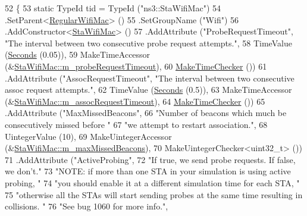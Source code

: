 \begin{DoxyCode}
52 \{
53   \textcolor{keyword}{static} TypeId tid = TypeId (\textcolor{stringliteral}{"ns3::StaWifiMac"})
54     .SetParent<\hyperlink{classns3_1_1RegularWifiMac_a56bc0e2b8ecde6fc50e6f8921ce64957}{RegularWifiMac}> ()
55     .SetGroupName (\textcolor{stringliteral}{"Wifi"})
56     .AddConstructor<\hyperlink{classns3_1_1StaWifiMac_afdd976cc1453f809bb1cad9924e9ff04}{StaWifiMac}> ()
57     .AddAttribute (\textcolor{stringliteral}{"ProbeRequestTimeout"}, \textcolor{stringliteral}{"The interval between two consecutive probe request attempts."},
58                    TimeValue (\hyperlink{group__timecivil_ga33c34b816f8ff6628e33d5c8e9713b9e}{Seconds} (0.05)),
59                    MakeTimeAccessor (&\hyperlink{classns3_1_1StaWifiMac_acd3c1903e18cd6b544fa4d373f970613}{StaWifiMac::m\_probeRequestTimeout}),
60                    \hyperlink{group__time_ga7032965bd4afa578691d88c09e4481c1}{MakeTimeChecker} ())
61     .AddAttribute (\textcolor{stringliteral}{"AssocRequestTimeout"}, \textcolor{stringliteral}{"The interval between two consecutive assoc request attempts."},
62                    TimeValue (\hyperlink{group__timecivil_ga33c34b816f8ff6628e33d5c8e9713b9e}{Seconds} (0.5)),
63                    MakeTimeAccessor (&\hyperlink{classns3_1_1StaWifiMac_acac4078bfd17c0ecc1991b88fd97a242}{StaWifiMac::m\_assocRequestTimeout}),
64                    \hyperlink{group__time_ga7032965bd4afa578691d88c09e4481c1}{MakeTimeChecker} ())
65     .AddAttribute (\textcolor{stringliteral}{"MaxMissedBeacons"},
66                    \textcolor{stringliteral}{"Number of beacons which much be consecutively missed before "}
67                    \textcolor{stringliteral}{"we attempt to restart association."},
68                    UintegerValue (10),
69                    MakeUintegerAccessor (&\hyperlink{classns3_1_1StaWifiMac_a725655d9a8bb335d6156a0c0a5b0753f}{StaWifiMac::m\_maxMissedBeacons}),
70                    MakeUintegerChecker<uint32\_t> ())
71     .AddAttribute (\textcolor{stringliteral}{"ActiveProbing"},
72                    \textcolor{stringliteral}{"If true, we send probe requests. If false, we don't."}
73                    \textcolor{stringliteral}{"NOTE: if more than one STA in your simulation is using active probing, "}
74                    \textcolor{stringliteral}{"you should enable it at a different simulation time for each STA, "}
75                    \textcolor{stringliteral}{"otherwise all the STAs will start sending probes at the same time resulting in
       collisions. "}
76                    \textcolor{stringliteral}{"See bug 1060 for more info."},

\end{DoxyCode}
